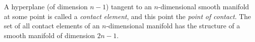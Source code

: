 A hyperplane (of dimension $n-1$) tangent to an $n$-dimensional smooth manifold at some point is called a \textit{contact element}, and this point the \textit{point of contact}. The set of all contact elements of an $n$-dimensional manifold has the structure of a smooth manifold of dimension $2n-1$.
